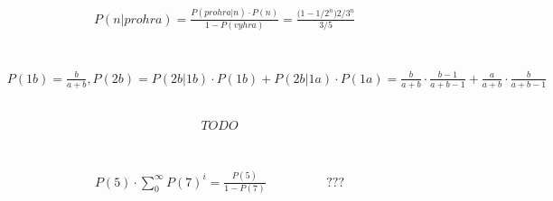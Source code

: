 \documentclass[a4paper]{article}
\begin{document}
\subsection{}
\begin{align*}
& P(n|prohra) = \frac{P(prohra|n) \cdot P(n) }{1-P(vyhra)} = \frac{\big( 1- 1/2^n\big) 2/3^n}{3/5}
\end{align*}

\section{}
\subsection{}
\begin{align*}
& P(1b) = \frac{b}{a+b}, P(2b) = P(2b|1b)\cdot P(1b) + P(2b|1a)\cdot P(1a) = \frac{b}{a+b}\cdot \frac{b-1}{a+b-1} + \frac{a}{a+b}\cdot \frac{b}{a+b-1} 
\end{align*}

\subsection{}
\begin{align*}
TODO
\end{align*}

\section{}
\begin{align*}
P(5) \cdot \sum_0^\infty P(7)^i= \frac{P(5)}{1-P(7)}\hspace{2cm} ???
\end{align*}
\end{document}
